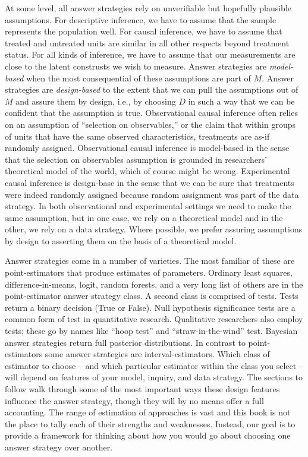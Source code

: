 \documentclass[
]{article}
\begin{document}
At some level, all answer strategies rely on unverifiable but hopefully
plausible assumptions. For descriptive inference, we have to assume that
the sample represents the population well. For causal inference, we have
to assume that treated and untreated units are similar in all other
respects beyond treatment status. For all kinds of inference, we have to
assume that our measurements are close to the latent construsts we wish
to measure. Answer strategies are \emph{model-based} when the most
consequential of these assumptions are part of \(M\). Answer strategies
are \emph{design-based} to the extent that we can pull the assumptions
out of \(M\) and assure them by design, i.e., by choosing \(D\) in such
a way that we can be confident that the assumption is true.
Observational causal inference often relies on an assumption of
``selection on observables,'' or the claim that within groups of units
that have the same observed characteristics, treatments are as-if
randomly assigned. Observational causal inference is model-based in the
sense that the selection on observables assumption is grounded in
researchers' theoretical model of the world, which of course might be
wrong. Experimental causal inference is design-base in the sense that we
can be sure that treatments were indeed randomly assigned because random
assignment was part of the data strategy. In both observational and
experimental settings we need to make the same assumption, but in one
case, we rely on a theoretical model and in the other, we rely on a data
strategy. Where possible, we prefer assuring assumptions by design to
asserting them on the basis of a theoretical model.

Answer strategies come in a number of varieties. The most familiar of
these are point-estimators that produce estimates of parameters.
Ordinary least squares, difference-in-means, logit, random forests, and
a very long list of others are in the point-estimator answer strategy
class. A second class is comprised of tests. Tests return a binary
decision (True or False). Null hypothesis significance tests are a
common form of test in quantitative research. Qualitative researchers
also employ tests; these go by names like ``hoop test'' and
``straw-in-the-wind'' test. Bayesian answer strategies return full
posterior distributions. In contrast to point-estimators some answer
strategies are interval-estimators. Which class of estimator to choose
-- and which particular estimator within the class you select -- will
depend on features of your model, inquiry, and data strategy. The
sections to follow walk through some of the most important ways these
design features influence the answer strategy, though they will by no
means offer a full accounting. The range of estimation of approaches is
vast and this book is not the place to tally each of their strengths and
weaknesses. Instead, our goal is to provide a framework for thinking
about how you would go about choosing one answer strategy over another.
\end{document}
